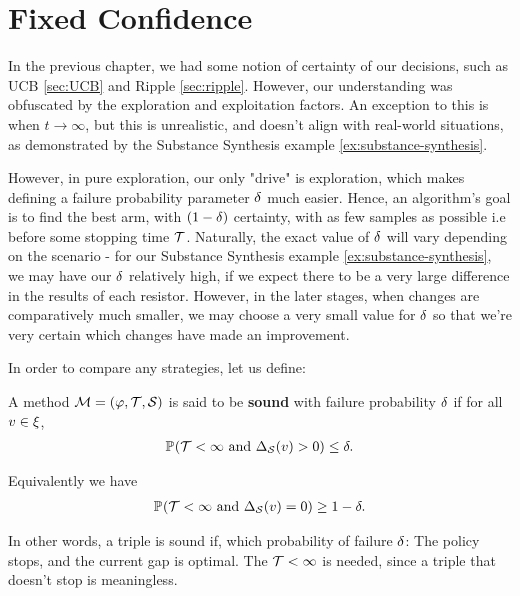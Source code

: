 \section{Fixed Confidence}
\label{sec:fixedconfidence}

In the previous chapter, we had some notion of certainty of our decisions, such as UCB \ref{sec:UCB} and Ripple \ref{sec:ripple}. However, our understanding was obfuscated by the exploration and exploitation factors. An exception to this is when $t \rightarrow \infty$, but this is unrealistic, and doesn't align with real-world situations, as demonstrated by the Substance Synthesis example \ref{ex:substance-synthesis}.

However, in pure exploration, our only "drive" is exploration, which makes defining a failure probability parameter $\delta$ much easier. Hence, an algorithm's goal is to find the best arm, with $(1-\delta)$ certainty, with as few samples as possible i.e before some stopping time $\mathcal{T}$. Naturally, the exact value of $\delta$ will vary depending on the scenario - for our Substance Synthesis example \ref{ex:substance-synthesis}, we may have our $\delta$ relatively high, if we expect there to be a very large difference in the results of each resistor. However, in the later stages, when changes are comparatively much smaller, we may choose a very small value for $\delta$ so that we're very certain which changes have made an improvement.

In order to compare any strategies, let us define:

\begin{definition}\label{def:soundess}
A method  $\mathcal{M} = (\varphi, \mathcal{T}, \mathcal{S})$ is said to be \textbf{sound} with failure probability $\delta$ if for all  $v \in \xi$,
\begin{align}
\mathbb{P}_{}(\mathcal{T} < \infty  \text{ and }  \Delta_{\mathcal{S}}(v) > 0) \leq \delta.
\end{align}

Equivalently we have
\begin{align}
\mathbb{P}_{}(\mathcal{T} < \infty  \text{ and }  \Delta_{\mathcal{S}}(v) = 0) \geq 1-\delta.
\end{align}

\end{definition}

In other words, a triple is sound if, which probability of failure $\delta$: The policy stops, and the current gap is optimal. The $\mathcal{T} < \infty$ is needed, since a triple that doesn't stop is meaningless.

